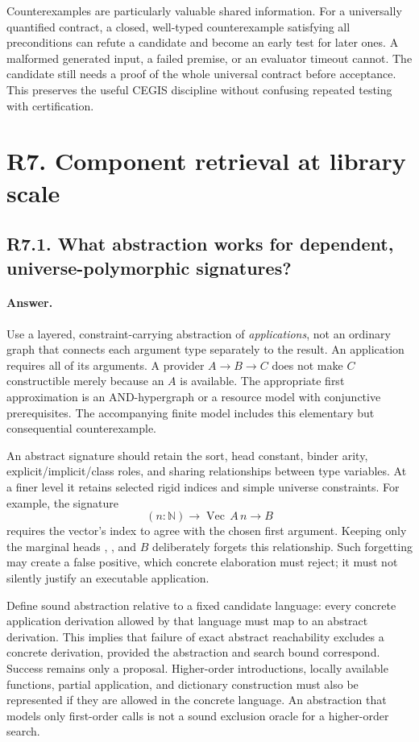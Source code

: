 \documentclass[11pt,a4paper]{article}
\newcommand{\code}[1]{\texttt{\detokenize{#1}}}
\newcommand{\answer}{\paragraph{Answer.}}
\theoremstyle{definition}
\theoremstyle{remark}
\begin{document}
Counterexamples are particularly valuable shared information. For a universally
quantified contract, a closed, well-typed counterexample satisfying all
preconditions can refute a candidate and become an early test for later ones.
A malformed generated input, a failed premise, or an evaluator timeout cannot.
The candidate still needs a proof of the whole universal contract before
acceptance. This preserves the useful CEGIS discipline without confusing
repeated testing with certification.

\section{R7. Component retrieval at library scale}
\label{sec:r7}

\subsection{R7.1. What abstraction works for dependent, universe-polymorphic signatures?}
\answer Use a layered, constraint-carrying abstraction of \emph{applications}, not
an ordinary graph that connects each argument type separately to the result.
An application requires all of its arguments. A provider $A\to B\to C$ does not
make $C$ constructible merely because an $A$ is available. The appropriate first
approximation is an AND-hypergraph or a resource model with conjunctive
prerequisites. The accompanying finite model includes this elementary but
consequential counterexample.

An abstract signature should retain the sort, head constant, binder arity,
explicit/implicit/class roles, and sharing relationships between type variables.
At a finer level it retains selected rigid indices and simple universe
constraints. For example, the signature
\[
 (n:\mathbb N)\to \operatorname{Vec}\,A\,n\to B
\]
requires the vector's index to agree with the chosen first argument. Keeping
only the marginal heads \code{Nat}, \code{Vec}, and $B$ deliberately forgets this
relationship. Such forgetting may create a false positive, which concrete
elaboration must reject; it must not silently justify an executable application.

Define sound abstraction relative to a fixed candidate language: every concrete
application derivation allowed by that language must map to an abstract
derivation. This implies that failure of exact abstract reachability excludes
a concrete derivation, provided the abstraction and search bound correspond.
Success remains only a proposal. Higher-order introductions, locally available
functions, partial application, and dictionary construction must also be
represented if they are allowed in the concrete language. An abstraction that
models only first-order calls is not a sound exclusion oracle for a higher-order
search.
\end{document}
